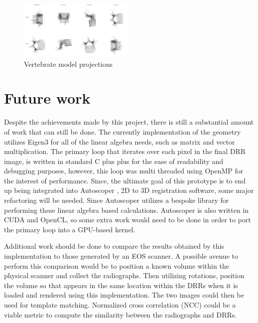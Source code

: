 \documentclass[12pt,twocolumn]{article}
\begin{document}
\begin{figure}[H]
  \begin{center}
    \includegraphics[width=0.5\textwidth]{img/vertabrate-composite_labled.png}
  \end{center}
  \caption{Vertebrate model projections}
\end{figure}


\section{Future work}
Despite the achievements made by this project, there is still a substantial amount of work that can still be done. 
The currently implementation of the geometry utilizes Eigen3 \cite{eigenweb} for all of the linear algebra needs, 
such as matrix and vector multiplication. The primary loop that iterates over each pixel in the final DRR image, is
written in standard C plus plus for the ease of readability and debugging purposes, however, this loop was 
multi threaded using OpenMP \cite{dagum1998openmp} for the interest of performance.
Since, the ultimate goal of this prototype is to end up being integrated into Autoscoper \cite{AKHBARI2019120}, 
2D to 3D registration software, some major refactoring will be needed. Since Autoscoper utilizes a bespoke library
for performing these linear algebra based calculations. Autoscoper is also written in CUDA and OpenCL, so some extra
work would need to be done in order to port the primary loop into a GPU-based kernel.

Additional work should be done to compare the results obtained by this implementation to those generated by 
an EOS\textregistered{} scanner. A possible avenue to perform this comparison would be to position a known volume 
within the physical scanner and collect the radiographs. Then utilizing rotations, position the volume so that appears
in the same location within the DRRs when it is loaded and rendered using this implementation. The two images could 
then be used for template matching. Normalized cross correlation (NCC) \cite{5375779} could be a viable metric to compute the 
similarity between the radiographs and DRRs.
\end{document}
